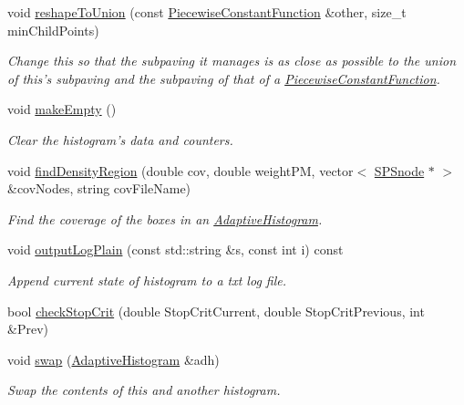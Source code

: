 \begin{DoxyCompactItemize}
void \hyperlink{classsubpavings_1_1AdaptiveHistogram_a9e30e2969e3ad675b8659470200219d4}{reshape\-To\-Union} (const \hyperlink{classsubpavings_1_1PiecewiseConstantFunction}{\-Piecewise\-Constant\-Function} \&other, size\-\_\-t min\-Child\-Points)
\begin{DoxyCompactList}\small\item\em \-Change this so that the subpaving it manages is as close as possible to the union of this's subpaving and the subpaving of that of a \hyperlink{classsubpavings_1_1PiecewiseConstantFunction}{\-Piecewise\-Constant\-Function}. \end{DoxyCompactList}\item 
void \hyperlink{classsubpavings_1_1AdaptiveHistogram_a8f3844b0b56fb1aaa96c44558dd8e4a4}{make\-Empty} ()
\begin{DoxyCompactList}\small\item\em \-Clear the histogram's data and counters. \end{DoxyCompactList}\item 
void \hyperlink{classsubpavings_1_1AdaptiveHistogram_aa0b81dd06668d2ce34e3fe983a2a2913}{find\-Density\-Region} (double cov, double weight\-P\-M, vector$<$ \hyperlink{classsubpavings_1_1SPSnode}{\-S\-P\-Snode} $\ast$ $>$ \&cov\-Nodes, string cov\-File\-Name)
\begin{DoxyCompactList}\small\item\em \-Find the coverage of the boxes in an \hyperlink{classsubpavings_1_1AdaptiveHistogram}{\-Adaptive\-Histogram}. \end{DoxyCompactList}\item 
void \hyperlink{classsubpavings_1_1AdaptiveHistogram_aa73a46279c3f591d298a0180d99723a5}{output\-Log\-Plain} (const std\-::string \&s, const int i) const 
\begin{DoxyCompactList}\small\item\em \-Append current state of histogram to a txt log file. \end{DoxyCompactList}\item 
bool \hyperlink{classsubpavings_1_1AdaptiveHistogram_a438e2252f954f0556fa2bd7c2e105dbe}{check\-Stop\-Crit} (double \-Stop\-Crit\-Current, double \-Stop\-Crit\-Previous, int \&\-Prev)
\item 
void \hyperlink{classsubpavings_1_1AdaptiveHistogram_a809928eec642c22761a2f9b3b8061d47}{swap} (\hyperlink{classsubpavings_1_1AdaptiveHistogram}{\-Adaptive\-Histogram} \&adh)
\begin{DoxyCompactList}\small\item\em \-Swap the contents of this and another histogram. \end{DoxyCompactList}\end{DoxyCompactItemize}
